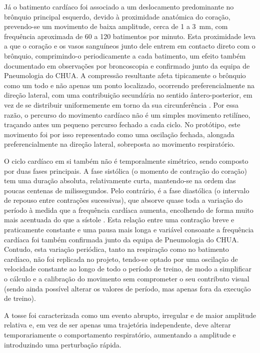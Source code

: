 Já o batimento cardíaco foi associado a um deslocamento predominante no brônquio principal esquerdo, devido à proximidade anatómica do coração, prevendo-se um movimento de baixa amplitude, cerca de 1 a \SI{3}{\milli\metre}, com frequência aproximada de 60 a 120 batimentos por minuto. Esta proximidade leva a que o coração e os vasos sanguíneos junto dele entrem em contacto direto com o brônquio, comprimindo-o periodicamente a cada batimento, um efeito também documentado em observações por broncoscopia \parencite{Arcieri2016} e confirmado junto da equipa de Pneumologia do CHUA. A compressão resultante afeta tipicamente o brônquio como um todo e não apenas um ponto localizado, ocorrendo preferencialmente na direção lateral, com uma contribuição secundária no sentido ântero-posterior, em vez de se distribuir uniformemente em torno da sua circunferência \parencite{Santos2026}. Por essa razão, o percurso do movimento cardíaco não é um simples movimento retilíneo, traçando antes um pequeno percurso fechado a cada ciclo. No protótipo, este movimento foi por isso representado como uma oscilação fechada, alongada preferencialmente na direção lateral, sobreposta ao movimento respiratório.

O ciclo cardíaco em si também não é temporalmente simétrico, sendo composto por duas fases principais. A fase sistólica (o momento de contração do coração) tem uma duração absoluta, relativamente curta, mantendo-se na ordem das poucas centenas de milissegundos. Pelo contrário, é a fase diastólica (o intervalo de repouso entre contrações sucessivas), que absorve quase toda a variação do período à medida que a frequência cardíaca aumenta, encolhendo de forma muito mais acentuada do que a sístole \parencite{Chung2004}. Esta relação entre uma contração breve e praticamente constante e uma pausa mais longa e variável consoante a frequência cardíaca foi também confirmada junto da equipa de Pneumologia do CHUA. Contudo, esta variação periódica, tanto na respiração como no batimento cardíaco, não foi replicada no projeto, tendo-se optado por uma oscilação de velocidade constante ao longo de todo o período de treino, de modo a simplificar o cálculo e a calibração do movimento sem comprometer o seu contributo visual (sendo ainda possível alterar os valores de período, mas apenas fora da execução de treino).

A tosse foi caracterizada como um evento abrupto, irregular e de maior amplitude relativa e, em vez de ser apenas uma trajetória independente, deve alterar temporariamente o comportamento respiratório, aumentando a amplitude e introduzindo uma perturbação rápida.

